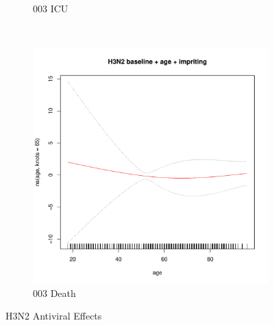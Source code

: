 \documentclass[12pt,twoside]{article}
\begin{document}
\begin{figure}[h]
{\begin{subfigure}{.49\linewidth}
                \caption{003 ICU}
        \end{subfigure}\\
        \begin{subfigure}{.49\linewidth}
                \includegraphics[width=\textwidth, page=4]{003Death_H3N2}
                \caption{003 Death}
        \end{subfigure}

        }
        \caption{H3N2 Antiviral Effects}\label{reduced}
    \end{figure}
\end{document}
